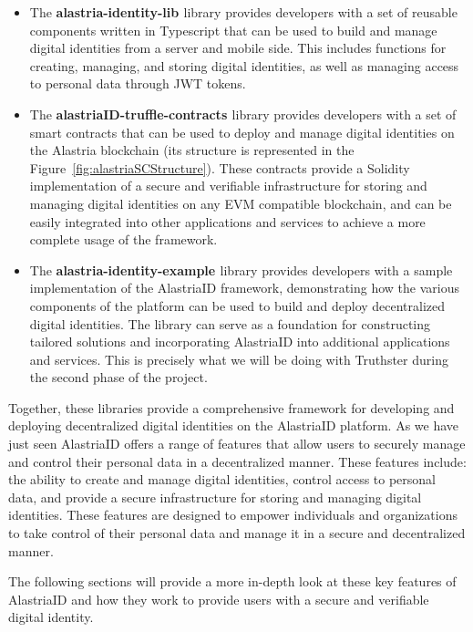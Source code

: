 \documentclass[target=mst,aauheader=]{thud}
\begin{document}
\begin{itemize}

    \item The \textbf{alastria-identity-lib \cite{alastriaIdentityLib}} library provides developers with a set of reusable components written in Typescript that can be used to build and manage digital identities from a server and mobile side. This includes functions for creating, managing, and storing digital identities, as well as managing access to personal data through JWT tokens.
    \item The \textbf{alastriaID-truffle-contracts \cite{alastriaSmartContracts}} library provides developers with a set of smart contracts that can be used to deploy and manage digital identities on the Alastria blockchain (its structure is represented in the Figure~\ref{fig:alastriaSCStructure}). These contracts provide a Solidity implementation of a secure and verifiable infrastructure for storing and managing digital identities on any EVM compatible blockchain, and can be easily integrated into other applications and services to achieve a more complete usage of the framework.
    \item The \textbf{alastria-identity-example \cite{alastriaIdentityExample}} library provides developers with a sample implementation of the AlastriaID framework, demonstrating how the various components of the platform can be used to build and deploy decentralized digital identities. The library can serve as a foundation for constructing tailored solutions and incorporating AlastriaID into additional applications and services. This is precisely what we will be doing with Truthster during the second phase of the project.

\end{itemize}

Together, these libraries provide a comprehensive framework for developing and deploying decentralized digital identities on the AlastriaID platform. 
As we have just seen AlastriaID offers a range of features that allow users to securely manage and control their personal data in a decentralized manner. These features include: the ability to create and manage digital identities, control access to personal data, and provide a secure infrastructure for storing and managing digital identities. These features are designed to empower individuals and organizations to take control of their personal data and manage it in a secure and decentralized manner.\par
The following sections will provide a more in-depth look at these key features of AlastriaID and how they work to provide users with a secure and verifiable digital identity.
\end{document}
